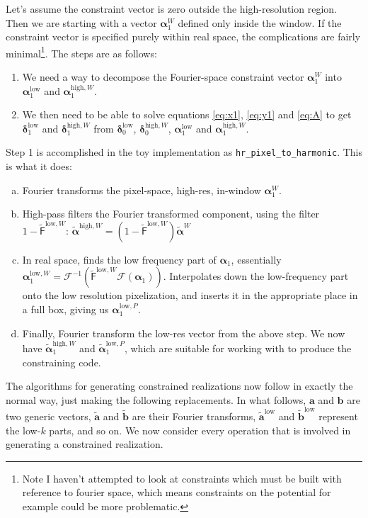 \documentclass[11pt,a4paper,preprint]{aastex}
\newcommand{\low}{\mathrm{low}}
\newcommand{\high}{\mathrm{high}}
\newcommand{\bmath}[1]{\ensuremath{\bm{#1}}}
\renewcommand{\vec}[1]{\bmath{#1}}
\begin{document}
Let's assume the constraint vector is zero outside the high-resolution region.
Then we are starting with a vector $\vec{\alpha}_1^W$ defined only inside the window.
If the constraint vector is specified purely within real space, the complications
are fairly minimal\footnote{Note I haven't attempted to look at constraints which must
be built with reference to fourier space, which means constraints on the potential for
example could be more problematic.}. The steps are as follows:
\begin{enumerate}
    \item We need a way to decompose the Fourier-space constraint vector
 $\vec{\alpha}_1^W$ into $\vec{\alpha}_1^{\low}$ and $\vec{\alpha}_1^{\high,W}$.
    \item We then need to be able
to solve equations \ref{eq:x1}, \ref{eq:y1} and \ref{eq:A} to get $\vec{\delta}_1^{\low}$ and
$\vec{\delta}_1^{\high,W}$ from $\vec{\delta}_0^{\low}$,
$\vec{\delta}_0^{\high,W}$, $\vec{\alpha}_1^{\low}$ and
$\vec{\alpha}_1^{\high,W}$.
\end{enumerate}
Step 1 is accomplished in the toy implementation as {\tt hr\_pixel\_to\_harmonic}.
This is what it does:
\begin{enumerate}[(a)]
    \item Fourier transforms the pixel-space, high-res, in-window $\vec{\alpha}^W_1$.
    \item High-pass filters the Fourier transformed component, using the filter $1-\tilde{\mathsf{F}}^{\low,W}$:
      $\tilde{\vec{\alpha}}^{\high,W} = (1-\tilde{\mathsf{F}}^{\low,W}) \tilde{\vec{\alpha}}^W$
    \item In real space, finds the low frequency part of $\vec{\alpha}_1$, essentially
      $\vec{\alpha}_1^{\low,W} = \mathcal{F}^{-1}(\tilde{\mathsf{F}}^{\low,W}\mathcal{F}(\vec{\alpha}_1))$.
    Interpolates down the low-frequency part onto the low resolution pixelization,
        and inserts it in the appropriate place in a full box, giving us
        $\vec{\alpha}_1^{\low,P}$.

    \item Finally, Fourier transform the low-res vector from the above step.
     We now have $\tilde{\vec{\alpha}}_1^{\high,W}$ and
        $\tilde{\vec{\alpha}}_1^{\low,P}$, which are suitable for working with to produce
        the constraining code.
\end{enumerate}

The algorithms for generating constrained realizations now follow in exactly the normal way, just
making the following replacements. In what follows, $\vec{a}$ and $\vec{b}$ are two generic
vectors, $\tilde{\vec{a}}$ and $\tilde{\vec{b}}$ are their Fourier transforms,
$\tilde{\vec{a}}^{\low}$ and $\tilde{\vec{b}}^{\low}$ represent the low-$k$ parts, and so on. We now
consider every operation that is involved in generating a constrained realization.
\end{document}
